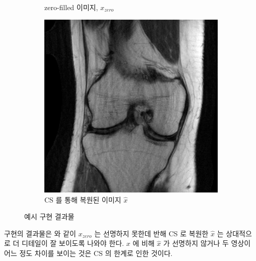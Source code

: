 \documentclass[twoside]{article}
\begin{document}
\begin{figure}[h]
\begin{subfigure}[b]{0.3\textwidth}
   \caption{zero-filled 이미지, $x_{zero}$}
  \end{subfigure}
  \begin{subfigure}[b]{0.3\textwidth}
   \centering
   \includegraphics[width=\textwidth]{figs/sense.png}
   \caption{CS 를 통해 복원된 이미지 $\hat{x}$}
  \end{subfigure}
  \caption{예시 구현 결과물}\label{fig:results}
\end{figure}

구현의 결과물은  와 같이 $x_{zero}$ 는 선명하지 못한데 반해 CS 로 복원한 $\hat{x}$ 는 상대적으로 더 디테일이 잘 보이도록 나와야 한다. $x$ 에 비해 $\hat{x}$ 가 선명하지 않거나 두 영상이 어느 정도 차이를 보이는 것은 CS 의 한계로 인한 것이다.
\end{document}
